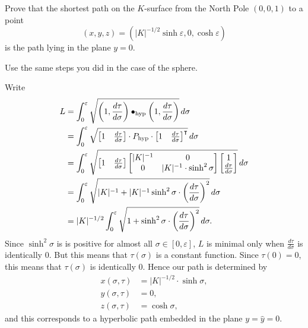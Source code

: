 \documentclass[handout,newpage,hints,,12pt,noauthor,nooutcomes]{ximera}
\begin{document}
\begin{problem}
  Prove that the shortest path on the $K$-surface from the North Pole
  $(0,0,1)$ to a point
  \[
  (x,y,z)=\left(|K|^{-1/2}\sinh \varepsilon,0,\cosh \varepsilon\right)
  \]
  is the path lying in the plane $y=0$.
  \begin{hint}
    Use the same steps you did in the case of the sphere.
  \end{hint}

  \begin{freeResponse}
    Write
    \begin{align*}
    L  &=\int_{0}^{\varepsilon} \sqrt{\left(1,\dd[\tau]{\sigma}\right)\bullet_\mathrm{hyp} \left(1,\dd[\tau]{\sigma}\right)}\d\sigma\\
    &= \int_{0}^{\varepsilon} \sqrt{
      \begin{bmatrix} 1 & \dd[\tau]{\sigma}
      \end{bmatrix} \cdot P_\mathrm{hyp}\cdot
      \begin{bmatrix} 1 & \dd[\tau]{\sigma}
      \end{bmatrix}^\transpose}\d\sigma \\
    &= \int_{0}^{\varepsilon} \sqrt{
      \begin{bmatrix} 1 & \dd[\tau]{\sigma}
      \end{bmatrix}
      \begin{bmatrix}
        |K|^{-1} & 0 \\
        0 & |K|^{-1}\cdot\sinh^2 \sigma
      \end{bmatrix}
      \begin{bmatrix} 1 \\ \dd[\tau]{\sigma}
    \end{bmatrix}}\d\sigma \\
    &= \int_{0}^{\varepsilon} \sqrt{
      |K|^{-1}+|K|^{-1}\sinh^{2}\sigma\cdot \left(\frac{d\tau }{d\sigma}\right)^{2}
    }\d\sigma \\
    &= |K|^{-1/2}\int_{0}^{\varepsilon} \sqrt{
      1+\sinh^{2}\sigma\cdot \left(\frac{d\tau }{d\sigma}\right)^{2}
    }\d\sigma.
    \end{align*}
   Since $\sinh^{2}\sigma$ is is positive for almost all $\sigma\in[
     0,\varepsilon] $, $L$ is minimal only when
   $\frac{d\tau}{d\sigma}$ is identically $0$. But this means that
   $\tau\left( \sigma\right) $ is a constant function. Since
   $\tau\left( 0\right) =0$, this means that $\tau\left( \sigma\right)
   $ is identically $0$. Hence our path is determined by
   \begin{align*}
     x(\sigma,\tau) &=|K|^{-1/2}\cdot \sinh\sigma,\\
     y(\sigma,\tau) &=0,\\
     z(\sigma,\tau) &=\cosh \sigma,
   \end{align*}
   and this corresponds to a hyperbolic path embedded in the plane
   $y=\hat{y}=0$.
  \end{freeResponse}

\end{problem}
\end{document}
